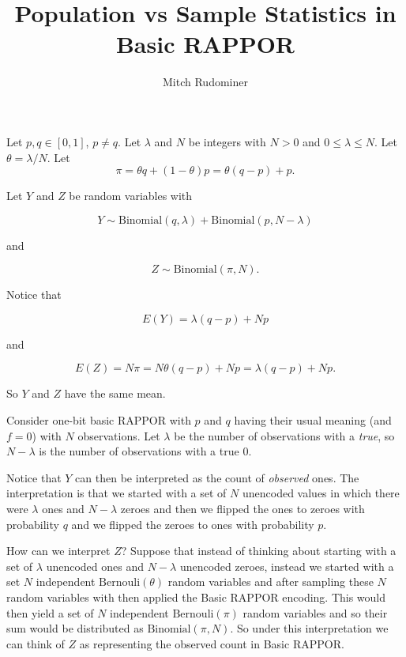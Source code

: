 \documentclass[oneside,12pt]{amsart}
\begin{document}
\title{Population vs Sample Statistics in Basic RAPPOR\vspace{-1cm}}
\author{Mitch Rudominer\vspace{-0.4cm}}

\maketitle

Let $p, q \in [0, 1]$, $p\not= q$.
Let $\lambda$ and $N$ be integers with $N>0$ and $0\leq\lambda\leq N$.
Let $\theta=\lambda/N$. Let
$$\pi = \theta q + (1-\theta) p = \theta(q-p) + p.$$

Let $Y$ and $Z$ be random variables with

$$Y\sim\text{Binomial}(q, \lambda) + \text{Binomial}(p, N - \lambda)$$

and

$$Z\sim\text{Binomial}(\pi, N).$$

Notice that

$$E(Y) = \lambda (q - p) + N p$$

and

$$E(Z) = N\pi = N\theta(q-p) + N p = \lambda (q - p) + N p.$$

So $Y$ and $Z$ have the same mean.

Consider one-bit basic RAPPOR with $p$ and $q$ having their usual meaning
(and $f=0$) with $N$ observations.
Let $\lambda$ be the number of observations with a \emph{true}, so
$N - \lambda$ is the number of observations with a true 0.

Notice that $Y$ can then be interpreted as the count of \emph{observed} ones.
The interpretation is that we started with a set of $N$ unencoded values in
which there were $\lambda$ ones and $N - \lambda$ zeroes and then we flipped
the ones to zeroes with probability $q$ and we flipped the zeroes to ones
with probability $p$.

How can we interpret $Z$? Suppose that instead of thinking about starting with
a set of $\lambda$ unencoded ones and $N-\lambda$ unencoded zeroes, instead
we started with a set $N$ independent $\text{Bernouli}(\theta)$ random variables and after
sampling these $N$ random variables with then applied the Basic RAPPOR encoding.
This would then yield a set of $N$ independent $\text{Bernouli}(\pi)$ random
variables and so their sum would be distributed as $\text{Binomial}(\pi, N)$.
So under this interpretation we can think of $Z$ as representing the observed
count in Basic RAPPOR.
\end{document}
